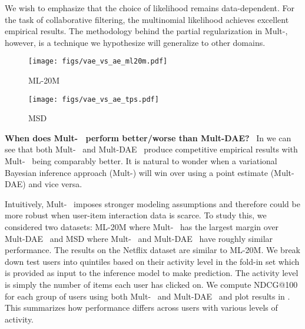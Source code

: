 \documentclass[sigconf]{acmart}
\DeclareRobustCommand{\parhead}[1]{\textbf{#1}~}
\newcommand{\mvae}{{\small Mult-}}
\newcommand{\mdae}{{\small Mult-}\gls{DAE}}
\begin{document}
We wish to emphasize that the choice of likelihood remains data-dependent. For the task of collaborative filtering, the multinomial likelihood achieves excellent empirical results.
The methodology behind the partial regularization in \mvae, however, is a technique we hypothesize will 
generalize to other domains. 

\begin{figure*}[!ht]
  \centering
  \centering
    \begin{subfigure}[b]{\textwidth}
  \texttt{[image: figs/vae\_vs\_ae\_ml20m.pdf]}
        \caption{ML-20M}
        \label{fig:vae_ae_ml20m}
    \end{subfigure}

   \begin{subfigure}[b]{\textwidth}
  \texttt{[image: figs/vae\_vs\_ae\_tps.pdf]}
        \caption{MSD}
        \label{fig:vae_ae_msd}
    \end{subfigure}

    \caption{NDCG@100 breakdown for users with increasing levels of activity (starting from ), measured by how many items a user clicked on in the fold-in set. The error bars represents one standard error. For each subplot, a paired t-test is performed and * indicates statistical significance at  level, ** at  level, and *** at  level. Although details vary across datasets, \mvae~ consistently improves recommendation performance for users who have only clicked on a small number of items.}\label{fig:vae_ae}

\end{figure*}

\parhead{When does \mvae~ perform better/worse than \mdae?}
In  we can see that both \mvae~ and \mdae~ produce competitive empirical results with \mvae~ being comparably better. It is natural to wonder when a variational Bayesian inference approach (\mvae) will win over using a point estimate (\mdae) and vice versa. 

Intuitively, \mvae~ imposes stronger modeling assumptions and therefore could be more robust when user-item interaction data is scarce. To study this, we considered two datasets: ML-20M where \mvae~ has the largest margin over \mdae~ and MSD where \mvae~ and \mdae~ have roughly similar performance. The results on the Netflix dataset are similar to ML-20M. 
We break down test users into quintiles based on their activity level in the fold-in set which is provided as input to the inference model  to make prediction. The activity level is simply the number of items each user has clicked on. We compute NDCG@100 for each group of users using both \mvae~ and \mdae~ and plot results in . This summarizes how performance differs across users with various levels of activity. 
\end{document}
